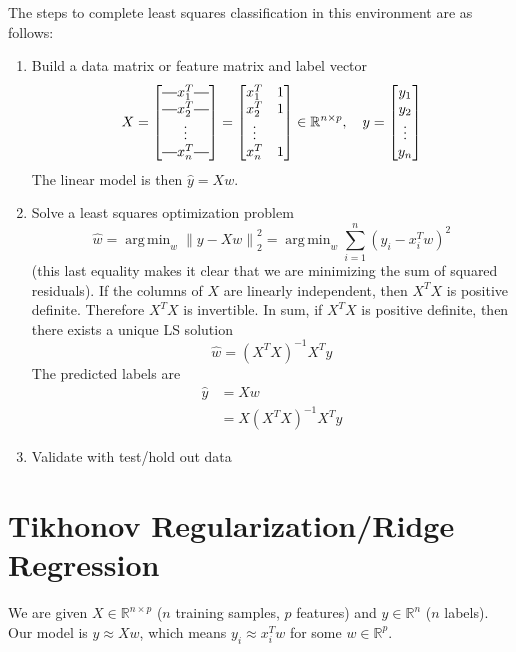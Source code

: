 \documentclass[12pt]{article}
\theoremstyle{definition}
\DeclareMathOperator*{\argmin}{arg\,min}
\newcommand{\R}{\mathbb{R}}
\newcommand{\norm}[1]{\left\lVert#1\right\rVert}
\newcommand*{\horzbar}{\rule[.5ex]{2.5ex}{0.5pt}}
\begin{document}
The steps to complete least squares classification in this environment are as follows:
\begin{enumerate}
	\item Build a data matrix or feature matrix and label vector
	\begin{equation}
		X = 
		\begin{bmatrix}
		\horzbar x_1^T \horzbar \\
		\horzbar x_2^T \horzbar \\
		\vdots \\
		\horzbar x_n^T \horzbar
		\end{bmatrix} =
		\begin{bmatrix}
		x_1^T & 1 \\
		x_2^T & 1 \\
		\vdots \\
		x_n^T & 1
		\end{bmatrix}
		\in \R^{n \times p},
		\quad
		y = 
		\begin{bmatrix}
		y_1 \\
		y_2 \\
		\vdots \\
		y_n
		\end{bmatrix}
	\end{equation}
	The linear model is then $\hat{y} = Xw$.
	\item Solve a least squares optimization problem 
	\begin{equation}
	 	\hat{w} = \argmin_w \norm{y - Xw}_2^2 = \argmin_w \sum_{i=1}^n (y_i- x_i^T w)^2
	 \end{equation} 
	 (this last equality makes it clear that we are minimizing the sum of squared residuals). If the columns of $X$ are linearly independent, then $X^T X$ is positive definite. Therefore $X^T X$ is invertible. In sum, if $X^T X$ is positive definite, then there exists a unique LS solution 
	 \begin{equation}
	 	\hat{w} = (X^T X)^{-1} X^T y
	 \end{equation}
	 The predicted labels are
	 \begin{align*}
	 \hat{y} &= Xw \\
	 &= X (X^T X)^{-1} X^T y
	 \end{align*}

	 \item Validate with test/hold out data
\end{enumerate}

\section{Tikhonov Regularization/Ridge Regression}
We are given $X \in \R^{n \times p}$ ($n$ training samples, $p$ features) and $y \in \R^n$ ($n$ labels). Our model is $y \approx Xw$, which means $y_i \approx x_i^T w$ for some $w \in \R^p$. 
\end{document}
